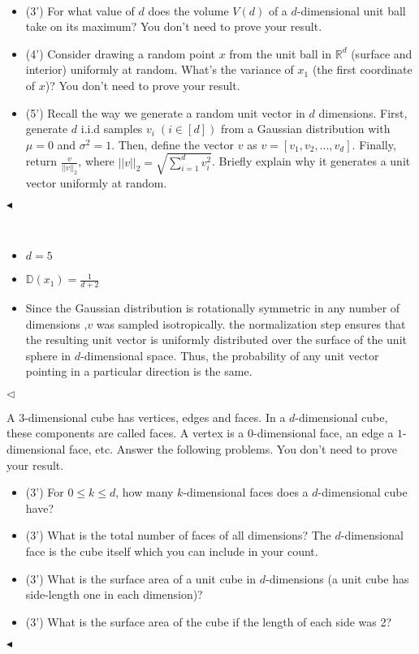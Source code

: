 \documentclass[11pt]{article}
\newenvironment{problem}[2][Problem]{\begin{trivlist}
\item[\hskip \labelsep {\bfseries #1}\hskip \labelsep {\bfseries #2.}]}{\hfill$\blacktriangleleft$\end{trivlist}}
\newenvironment{answer}[1][Answer]{\begin{trivlist}
\item[\hskip \labelsep {\bfseries #1.}\hskip \labelsep]}{\hfill$\lhd$\end{trivlist}}
\begin{document}
\begin{problem}{5 (12')} ~
\begin{itemize}
    \item [(1)] (3') For what value of $d$ does the volume $V(d)$ of a $d$-dimensional unit ball take on its maximum? You don't need to prove your result.
    \item [(2)] (4') Consider drawing a random point $x$ from the unit ball in $\mathbb{R}^d$ (surface and interior) uniformly at random. What's the variance of $x_1$ (the first coordinate of $x$)? You don't need to prove your result.
    \item [(3)] (5') Recall the way we generate a random unit vector in $d$ dimensions. First, generate $d$ i.i.d samples $v_i\;(i\in [d])$ from a Gaussian distribution with $\mu=0$ and $\sigma^2=1$. Then, define the vector $v$ as $v=[v_1,v_2,...,v_d]$. Finally, return $\frac{v}{||v||_2}$, where $||v||_2=\sqrt{\sum_{i=1}^d v_i^2}$. Briefly explain why it generates a unit vector uniformly at random.
\end{itemize}
\end{problem}

\begin{answer} ~
\begin{itemize}
    \item [(1)] $d=5$
    \item [(2)] $\mathbb D(x_1)=\frac{1}{d+2}$
    \item [(3)]  Since the Gaussian distribution is rotationally symmetric in any number of dimensions ,$v$ was sampled isotropically. the normalization step ensures that the resulting unit vector is uniformly distributed over the surface of the unit sphere in $d$-dimensional space. Thus, the probability of any unit vector pointing in a particular direction is the same.
\end{itemize}
\end{answer}



\begin{problem}{6 (12')}
A 3-dimensional cube has vertices, edges and faces. In a $d$-dimensional cube, these components are called faces. A vertex is a $0$-dimensional face, an edge a $1$-dimensional face, etc. Answer the following problems. You don't need to prove your result.
\begin{itemize}
    \item [(1)] (3') For $0\leq k\leq d$, how many $k$-dimensional faces does a $d$-dimensional cube have?
    \item [(2)] (3') What is the total number of faces of all dimensions? The $d$-dimensional face is the cube itself which you can include in your count.
    \item [(3)] (3') What is the surface area of a unit cube in $d$-dimensions (a unit cube has side-length one in each dimension)?
    \item [(4)] (3') What is the surface area of the cube if the length of each side was 2?
\end{itemize}
\end{problem}
\end{document}
